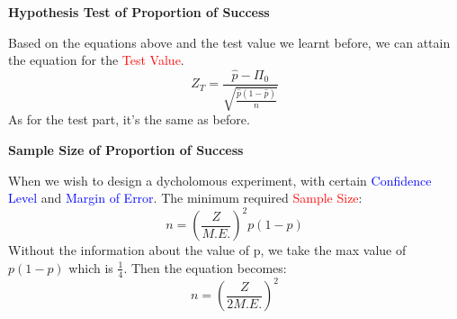 \vspace{5ex}
\begin{Center}
    \textbf{Hypothesis Test of Proportion of Success}
\end{Center}
Based on the equations above and the test value we learnt before, we can attain the equation for the \textcolor{red}{Test Value}.
\begin{equation}
    Z_{T}=\frac{\hat{p}-\Pi_{0}}{\sqrt{\frac{\hat{p}(1-\hat{p})}{n}}}
\end{equation}
As for the test part, it's the same as before.

\vspace{5ex}
\begin{Center}
    \textbf{Sample Size of Proportion of Success}
\end{Center}
When we wish to design a dycholomous experiment, with certain \textcolor{blue}{Confidence Level} and \textcolor{blue}{Margin of Error}. The minimum required \textcolor{red}{Sample Size}:
\begin{equation}
    n=(\frac{Z}{M.E.})^2p(1-p)
\end{equation}
Without the information about the value of p, we take the max value of \(p(1-p)\) which is \(\frac{1}{4}\). Then the equation becomes:
\begin{equation}
    n=(\frac{Z}{2M.E.})^2
\end{equation}

